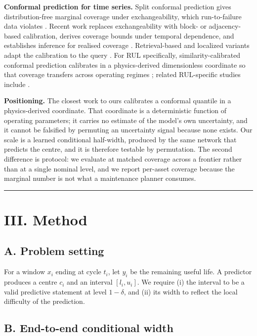 ﻿\documentclass[journal]{IEEEtran}
\begin{document}
\textbf{Conformal prediction for time series.} Split conformal prediction gives distribution-free marginal coverage under exchangeability, which run-to-failure data violates \citep{barber2023}. Recent work replaces exchangeability with block- or adjacency-based calibration, derives coverage bounds under temporal dependence, and establishes inference for realised coverage \citep{zhai2026a, zhai2026b, lee2026}. Retrieval-based and localized variants adapt the calibration to the query \citep{jin2026}. For RUL specifically, similarity-calibrated conformal prediction calibrates in a physics-derived dimensionless coordinate so that coverage transfers across operating regimes \citep{busico2026}; related RUL-specific studies include \citep{wu2025, sensors2026, yang2026}.

\textbf{Positioning.} The closest work to ours calibrates a conformal quantile in a physics-derived coordinate. That coordinate is a deterministic function of operating parameters; it carries no estimate of the model's own uncertainty, and it cannot be falsified by permuting an uncertainty signal because none exists. Our scale is a learned conditional half-width, produced by the same network that predicts the centre, and it is therefore testable by permutation. The second difference is protocol: we evaluate at matched coverage across a frontier rather than at a single nominal level, and we report per-asset coverage because the marginal number is not what a maintenance planner consumes.

\begin{center}\rule{0.5\linewidth}{0.5pt}\end{center}

\section{III. Method}\label{iii.-method}

\subsection{A. Problem setting}\label{a.-problem-setting}

For a window \(x_i\) ending at cycle \(t_i\), let \(y_i\) be the remaining useful life. A predictor produces a centre \(c_i\) and an interval \([l_i, u_i]\). We require (i) the interval to be a valid predictive statement at level \(1-\delta\), and (ii) its width to reflect the local difficulty of the prediction.

\subsection{B. End-to-end conditional width}\label{b.-end-to-end-conditional-width}
\end{document}
